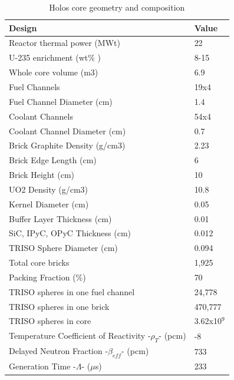 \documentclass[10pt,a4paper]{article}
\begin{document}
\begin{table} [htbp]
\begin{center}

\caption{Holos core geometry and composition}
\label{Holostable}
\begin{tabular}{l     l}
\hline 
Design 		&Value \\ 
\hline 
Reactor thermal power (MWt)&22                                             \\
U-235 enrichment (wt\% )&8-15             \\
Whole core volume (m3)&6.9                                        \\
\hline 
Fuel Channels&19x4                      \\
Fuel Channel Diameter (cm)&1.4            \\
Coolant Channels&54x4                   \\
Coolant Channel Diameter (cm)&0.7               \\
Brick Graphite Density (g/cm3)&2.23              \\
Brick Edge Length (cm)&6               \\
Brick Height (cm)&10             \\
\hline 
UO2 Density  (g/cm3) & 10.8                       \\
Kernel Diameter  (cm) & 0.05                       \\
Buffer Layer Thickness  (cm) & 0.01            \\
SiC, IPyC, OPyC Thickness  (cm) & 0.012   \\
TRISO Sphere Diameter  (cm) & 0.094         \\
Total core bricks & 1,925                           \\
Packing Fraction (\%) & 70                       \\
\hline 
TRISO spheres in one fuel channel  &24,778   \\
TRISO spheres in one brick            &470,777 \\
TRISO spheres in core  &3.62x10$^{9}$            \\
\hline 
Temperature Coefficient of Reactivity -$\rho_{T}$- (pcm)&-8       \\
Delayed Neutron Fraction -$\beta_{eff}$- (pcm)&733      \\
Generation Time -$\Lambda$- ($\mu$s)&233                        \\
\hline 

\end{tabular}
\end{center}
\end{table}
\end{document}
